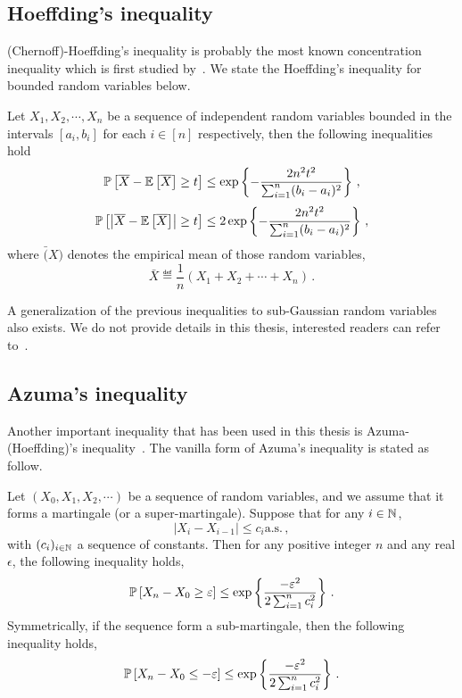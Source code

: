 \subsection{Hoeffding's inequality}

(Chernoff)-Hoeffding's inequality is probably the most known concentration inequality which is first studied by~\cite{hoeffding1963}. We state the Hoeffding's inequality for bounded random variables below.

\begin{theorem}\label{thm:maths.hoeffding}
\begin{leftbar}[theorembar]
    Let $X_1, X_2, \cdots, X_n$ be a sequence of independent random variables bounded in the intervals $[a_i,b_i]$ for each $i\in[n]$ respectively, then the following inequalities hold
    \[
        \mathbb{P}\left[\overline{X}-\mathbb{E}\left[\overline{X}\right] \geq t\right] \leq \exp\left\{-\frac{2n^2t^2}{\sum_{i=1}^n(b_i-a_i)^2}\right\}\,,
    \]
    \[
        \mathbb{P}\left[\left|\overline{X}-\mathbb{E}\left[\overline{X}\right]\right| \geq t\right] \leq 2\exp\left\{-\frac{2n^2t^2}{\sum_{i=1}^n(b_i-a_i)^2}\right\}\,,
    \]
    where $\bar(X)$ denotes the empirical mean of those random variables,
    \[
        \bar{X} \eqdef \frac{1}{n}(X_1+X_2+\cdots+X_n)\,.
    \]
\end{leftbar}
\end{theorem}

A generalization of the previous inequalities to sub-Gaussian random variables also exists. We do not provide details in this thesis, interested readers can refer to~\cite{vershynin2018}.

\subsection{Azuma's inequality}

Another important inequality that has been used in this thesis is Azuma-(Hoeffding)'s inequality~\citep{azuma1967}. The vanilla form of Azuma's inequality is stated as follow.

\begin{theorem}\label{thm:maths.azuma}
\begin{leftbar}[theorembar]
    Let $(X_0, X_1, X_2, \cdots)$ be a sequence of random variables, and we assume that it forms a martingale (or a super-martingale). Suppose that for any $i\in{\mathbb N}$,
    \[
        |X_i-X_{i-1}|\leq c_i \text{a.s.}\,,
    \]
    with $(c_i)_{i\in{\mathbb N}}$ a sequence of constants. Then for any positive integer $n$ and any real $\epsilon$, the following inequality holds,
    \[
        \mathbb{P}\left[X_n-X_0 \geq \varepsilon\right] \leq \exp\left\{\frac{-\varepsilon^2}{2\sum_{i=1}^n c_i^2}\right\}\,.
    \]
    Symmetrically, if the sequence form a sub-martingale, then the following inequality holds,
    \[
        \mathbb{P}\left[X_n-X_0 \leq -\varepsilon\right] \leq \exp\left\{\frac{-\varepsilon^2}{2\sum_{i=1}^n c_i^2}\right\}\,.
    \]
\end{leftbar}
\end{theorem}

